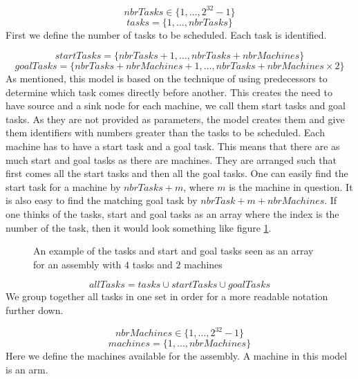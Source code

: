  \begin{equation}\label{eq:1}
 nbrTasks \in \{1 , \ldots , 2^{32}-1\}
 \end{equation}
 \begin{equation}\label{eq:10}
 tasks = \{1 , \ldots , nbrTasks\}
 \end{equation}
 First we define the number of tasks to be scheduled. Each task is identified.

 \begin{equation}\label{eq:19}
 startTasks = \{nbrTasks+1 , \ldots , nbrTasks+nbrMachines\}
 \end{equation}
 \begin{equation}\label{eq:20}
 goalTasks = \{nbrTasks+nbrMachines+1 , \ldots , nbrTasks+nbrMachines \times 2\}
 \end{equation}
  As mentioned, this model is based on the technique of using predecessors to determine which task comes directly before another. This creates the need to have source and a sink node for each machine, we call them start tasks and goal tasks. As they are not provided as parameters, the model creates them and give them identifiers with numbers greater than the tasks to be scheduled. Each machine has to have a start task and a goal task. This means that there are as much start and goal tasks as there are machines. They are arranged such that first comes all the start tasks and then all the goal tasks. One can easily find the start task for a machine by $nbrTasks + m$, where $m$ is the machine in question. It is also easy to find the matching goal task by $nbrTask + m + nbrMachines$. If one thinks of the tasks, start and goal tasks as an array where the index is the number of the task, then it would look something like figure \ref{fig:tasks_array}.
  
\begin{figure}
	\centering
	
	\caption{An example of the tasks and start and goal tasks seen as an array for an assembly with $4$ tasks and $2$ machines}
	\label{fig:tasks_array}
\end{figure}
 
 \begin{equation}\label{eq:21}
 allTasks = tasks \cup startTasks \cup goalTasks
 \end{equation}
 We group together all tasks in one set in order for a more readable notation further down.
 
 \begin{equation}\label{eq:2}
 nbrMachines \in \{1 , \ldots , 2^{32}-1\}
 \end{equation}
 \begin{equation}\label{eq:11}
 machines = \{1 , \ldots , nbrMachines\}
 \end{equation}
 Here we define the machines available for the assembly. A machine in this model is an arm.
 

